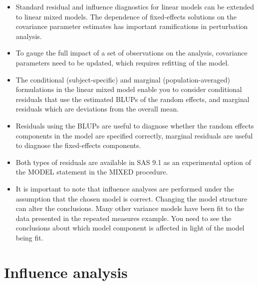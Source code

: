 \documentclass[12pt, a4paper]{article}
\begin{document}
\begin{itemize}
	\item Standard residual and inﬂuence diagnostics for linear models can be extended to linear mixed models. The dependence of ﬁxed-effects solutions on the covariance parameter estimates has important ramiﬁcations in perturbation analysis. 
	\item To gauge the full impact of a set of observations on the analysis, covariance parameters need to be updated, which requires reﬁtting of the model. 
	
	\item The conditional (subject-speciﬁc) and marginal (population-averaged) formulations in the linear mixed model enable you to consider conditional residuals that use the estimated BLUPs of the random effects, and marginal residuals which are deviations from the overall mean. 
	\item Residuals using the BLUPs are useful to diagnose whether the random effects components in the model are speciﬁed correctly, marginal residuals are useful to diagnose the ﬁxed-effects components. 
	\item Both types of residuals are available in SAS 9.1 as an experimental option of the MODEL statement in the MIXED procedure.
	
	\item It is important to note that influence analyses are performed under the assumption that the chosen model is correct. Changing the model structure can alter the conclusions. Many other variance models have been ﬁt to the data presented in the repeated measures example. You need to see the conclusions about which model component is affected in light of the model being fit.
\end{itemize}




\section{Influence analysis} %
\end{document}
